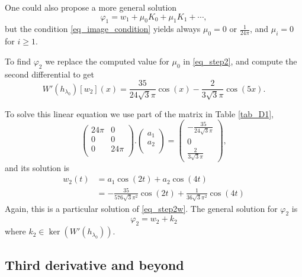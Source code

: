 \documentclass{amsart}
\begin{document}
One could also propose a more general solution
\[\varphi_1 = w_1 + \mu_0 K_0 + \mu_1 K_1 + \cdots,\]
but the condition \eqref{eq_image_condition} yields always $\mu_0 = 0$ or $\frac 1{24 \pi}$, and $\mu_i = 0$ for $i \geq 1$.

To find $\varphi_2$ we replace the computed value for $\mu_0$ in \eqref{eq_step2}, and compute the second differential to get
\begin{equation}
	\label{eq_step2w}
	W'(h_{\lambda_0})[w_2](x) = \frac{35}{24 \sqrt{3} \pi } \cos (x) - \frac{2}{3 \sqrt{3} \pi } \cos (5 x).
\end{equation}

To solve this linear equation we use part of the matrix in Table \ref{tab_D1},
\[
\left(
\begin{array}{cc}
 24 \pi & 0 \\
 0 & 0 \\
 0 & 24 \pi \\
\end{array}
\right).\left(
\begin{array}{c}
 a_1 \\
 a_2 \\
\end{array}
\right)=\left(
\begin{array}{c}
	-\frac{35}{24 \sqrt{3} \pi } \\
	 0 \\
	\frac{2}{3 \sqrt{3} \pi }
\end{array}
\right),
\]
and its solution is
\begin{align}
	w_2(t) 
	&= a_1 \cos (2 t) + a_2\cos (4 t) \\
	&= -\frac{35}{576 \sqrt{3} \pi ^2} \cos (2 t) + \frac{1}{36 \sqrt{3} \pi ^2}\cos (4 t)
\end{align}
Again, this is a particular solution of \eqref{eq_step2w}.
The general solution for $\varphi_2$ is
\[\varphi_2 = w_2 + k_2\]
where $k_2 \in \ker(W'(h_{\lambda_0}))$.

\subsection{Third derivative and beyond}
\end{document}
